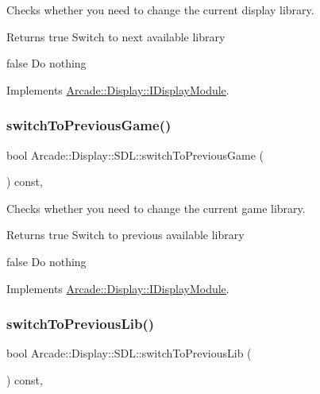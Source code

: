 Checks whether you need to change the current display library. 

\begin{DoxyReturn}{Returns}
true Switch to next available library 

false Do nothing 
\end{DoxyReturn}


Implements \mbox{\hyperlink{classArcade_1_1Display_1_1IDisplayModule_a0de47361c9d47bf8fc52070b945f23b7}{Arcade\+::\+Display\+::\+I\+Display\+Module}}.

\mbox{\label{classArcade_1_1Display_1_1SDL_ad9bf495fb4e7499c81b2d65a0602e7f1}} 
\subsubsection{\texorpdfstring{switchToPreviousGame()}{switchToPreviousGame()}}
{\footnotesize\ttfamily bool Arcade\+::\+Display\+::\+S\+D\+L\+::switch\+To\+Previous\+Game (\begin{DoxyParamCaption}{ }\end{DoxyParamCaption}) const\hspace{0.3cm}{\ttfamily [final]}, {\ttfamily [virtual]}}



Checks whether you need to change the current game library. 

\begin{DoxyReturn}{Returns}
true Switch to previous available library 

false Do nothing 
\end{DoxyReturn}


Implements \mbox{\hyperlink{classArcade_1_1Display_1_1IDisplayModule_a3bbbfe00907c8f3e4c7ef1aadedcc513}{Arcade\+::\+Display\+::\+I\+Display\+Module}}.

\mbox{\label{classArcade_1_1Display_1_1SDL_a27364feeadd0eb907f91e9e4c2ec1ef2}} 
\subsubsection{\texorpdfstring{switchToPreviousLib()}{switchToPreviousLib()}}
{\footnotesize\ttfamily bool Arcade\+::\+Display\+::\+S\+D\+L\+::switch\+To\+Previous\+Lib (\begin{DoxyParamCaption}{ }\end{DoxyParamCaption}) const\hspace{0.3cm}{\ttfamily [final]}, {\ttfamily [virtual]}}



